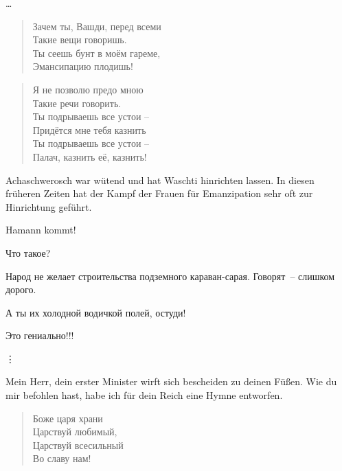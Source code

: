 \documentclass[12pt,a4paper,titlepage]{article}
\begin{document}
\begin{drama}
\uespeaks
\ldots

\ahspeaks {}
\begin{verse}
Зачем ты, Вашди, перед всеми\\
Такие вещи говоришь.\\
Ты сеешь бунт в моём гареме,\\
Эмансипацию плодишь!\\
\end{verse}

\begin{verse}
Я не позволю предо мною\\
Такие речи говорить.\\
Ты подрываешь все устои --\\
Придётся мне тебя казнить\\
Ты подрываешь все устои --\\
 Палач, казнить её, казнить!\\
\end{verse}


\uespeaks
Achaschwerosch war wütend und hat Waschti hinrichten lassen. In diesen früheren Zeiten
hat der Kampf der Frauen für Emanzipation sehr oft zur Hinrichtung geführt.

\scene


\uespeaks
Hamann kommt!

\ahspeaks
Что такое?

\amspeaks
Народ не желает строительства подземного караван-сарая. Говорят~-- слишком дорого.

\ahspeaks
А ты их холодной водичкой полей, остуди!

\amspeaks
Это гениально!!!

\vdots

\amspeaks
Mein Herr, dein erster Minister wirft sich bescheiden zu deinen Füßen.
Wie du mir befohlen hast, habe ich für dein Reich eine Hymne entworfen.

\amspeaks {}
\begin{verse}
Боже царя храни\\
Царствуй любимый,\\
Царствуй всесильный\\
Во славу нам!\\
\end{verse}


\end{drama}
\end{document}
